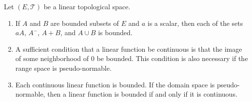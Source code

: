 Let $(E, \mathcal{T})$ be a linear topological space.
\begin{enumerate}
\item[(i)] If $A$ and $B$ are bounded subsets of $E$ and $a$ is a scalar, then each of the sets $aA$, $A^{-}$, $A + B$, and $A \cup B$ is bounded.
\item[(ii)] A sufficient condition that a linear function be continuous is that the image of some neighborhood of $0$ be bounded. This condition is also necessary if the range space is pseudo-normable.
\item[(iii)] Each continuous linear function is bounded. If the domain space is pseudo-normable, then a linear function is bounded if and only if it is continuous.
\end{enumerate}
